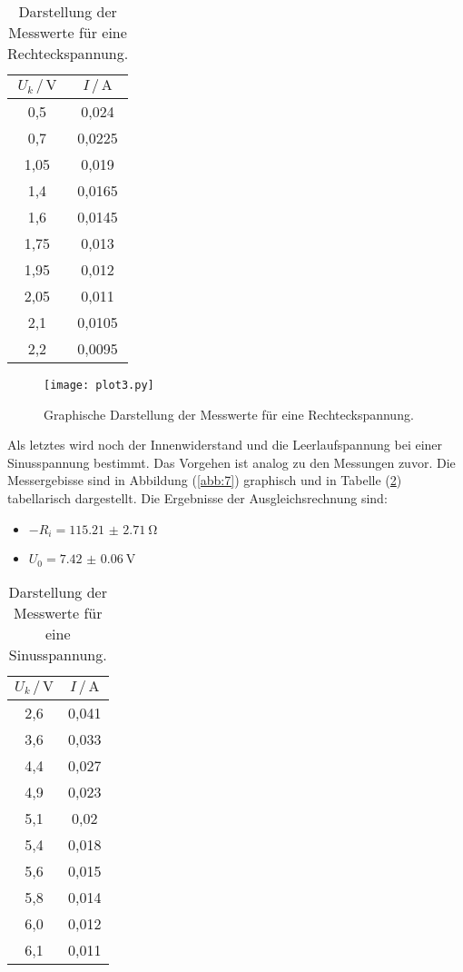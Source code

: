 \begin{table}[H]
  \centering
  \caption{Darstellung der Messwerte für eine Rechteckspannung.}
  \label{tab:3}
  \begin{tabular}{c c}
    \toprule
    $U_k \, / \, \si{\volt}$ & $ I \, / \, \si{\ampere}$ \\
    \midrule
    0,5  & 0,024  \\
    0,7  & 0,0225 \\
    1,05 & 0,019  \\
    1,4  & 0,0165 \\
    1,6  & 0,0145 \\
    1,75 & 0,013  \\
    1,95 & 0,012  \\
    2,05 & 0,011  \\
    2,1  & 0,0105 \\
    2,2  & 0,0095 \\
    \bottomrule
  \end{tabular}
\end{table}

\begin{figure}[H]
  \centering
  \texttt{[image: plot3.py]}
  \caption{Graphische Darstellung der Messwerte für eine Rechteckspannung.}
  \label{abb:6}
\end{figure}

Als letztes wird noch der Innenwiderstand und die Leerlaufspannung bei einer Sinusspannung
bestimmt. Das Vorgehen ist analog zu den Messungen zuvor. Die Messergebisse sind
in Abbildung (\ref{abb:7}) graphisch und in Tabelle (\ref{tab:4}) tabellarisch
dargestellt. Die Ergebnisse der Ausgleichsrechnung sind:

\begin{itemize}
  \item $-R_i = \SI{115.21(271)}{\ohm}$
  \item $U_0 = \SI{7.42(6)}{\volt}$
\end{itemize}

\begin{table}[H]
  \centering
  \caption{Darstellung der Messwerte für eine Sinusspannung.}
  \label{tab:4}
  \begin{tabular}{c c}
    \toprule
    $U_k \, / \, \si{\volt}$ & $ I \, / \, \si{\ampere}$ \\
    \midrule
    2,6 & 0,041 \\
    3,6 & 0,033 \\
    4,4 & 0,027 \\
    4,9 & 0,023 \\
    5,1 & 0,02  \\
    5,4 & 0,018 \\
    5,6 & 0,015 \\
    5,8 & 0,014 \\
    6,0 & 0,012 \\
    6,1 & 0,011 \\
    \bottomrule
  \end{tabular}
\end{table}

